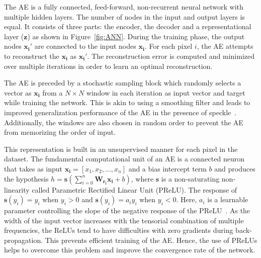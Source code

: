 The AE is a  fully connected, feed-forward, non-recurrent neural network with multiple hidden layers. 
The number of nodes in the input and output layers is equal. It consists of three parts: the encoder, the decoder and a representational layer ($\bm{z}$) as shown in Figure~\ref{fig:ANN}. During the training phase, the output nodes $\bm{x_i'}$ are connected to the input nodes $\bm{x_i}$. For each pixel $i$, the AE attempts to reconstruct the  $\bm{x_i}$ as  $\bm{x_i'}$. The reconstruction error is computed and minimized over multiple iterations in order to learn an optimal reconstruction. 

The AE is preceded by a  stochastic sampling block which randomly selects a vector as $\bm{x_i}$ from a $N\times N$ window in each iteration as input vector and target while training the network. This is akin to using a smoothing filter and leads to  %
improved generalization performance of the AE in the presence of speckle~\cite{zeiler2013stochastic}.
Additionally, the windows are also chosen in random order to prevent the AE from memorizing the order of input. 



This representation is built in an unsupervised manner for each pixel in the dataset. The fundamental computational unit of an AE is a connected neuron that takes as input $\bm{x_i} = \left[ x_1, x_2, \ldots ,x_n \right]$ and a bias intercept term $b$ and produces the hypothesis $h = \mathbf{s}(\sum_{i=0}^{n} \mathbf{W_{r_i}} \bm{x_i} + b)$, where $\mathbf{s}$ is a non-saturating non-linearity called  Parametric Rectified Linear Unit (PReLU). 
The response of $\mathbf{s}(y_i)=y_i$ when $y_i>0$ and $\mathbf{s}(y_i)=a_iy_i$ when $y_i<0$. Here, $a_i$ is a learnable parameter controlling the slope of the negative response of the PReLU~\cite{he2015delving}. 
As the width of the input vector increases with the tensorial combination of multiple frequencies, the ReLUs tend to have difficulties with zero gradients during back-propagation. This prevents  efficient training of the AE. Hence, the use of PReLUs helps to overcome this problem and improve the convergence rate of the network.   

